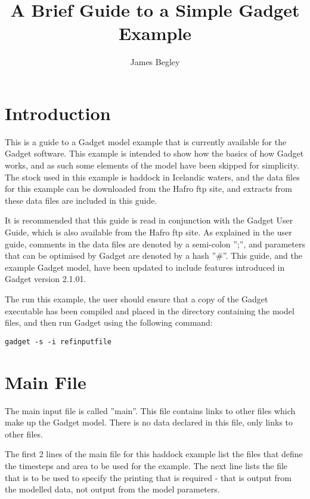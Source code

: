 \documentclass[10pt,twoside]{article}
\begin{document}
\title{\Huge{A Brief Guide to a Simple Gadget Example}}
\author{James Begley}
\date{}
\maketitle

\section{Introduction}
This is a guide to a Gadget model example that is currently available for the Gadget software.  This example is intended to show how the basics of how Gadget works, and as such some elements of the model have been skipped for simplicity.  The stock used in this example is haddock in Icelandic waters, and the data files for this example can be downloaded from the Hafro ftp site, and extracts from these data files are included in this guide.

\bigskip
It is recommended that this guide is read in conjunction with the Gadget User Guide, which is also available from the Hafro ftp site.  As explained in the user guide, comments in the data files are denoted by a semi-colon '';'', and parameters that can be optimised by Gadget are denoted by a hash ''\#''.  This guide, and the example Gadget model, have been updated to include features introduced in Gadget version 2.1.01. 

\bigskip
The run this example, the user should ensure that a copy of the Gadget executable has been compiled and placed in the directory containing the model files, and then run Gadget using the following command:

{\small\begin{verbatim}
gadget -s -i refinputfile
\end{verbatim}}

\section{Main File}
The main input file is called ''main''.  This file contains links to other files which make up the Gadget model.  There is no data declared in this file, only links to other files.

{\small }

The first 2 lines of the main file for this haddock example list the files that define the timesteps and area to be used for the example.  The next line lists the file that is to be used to specify the printing that is required - that is output from the modelled data, not output from the model parameters.
\end{document}
